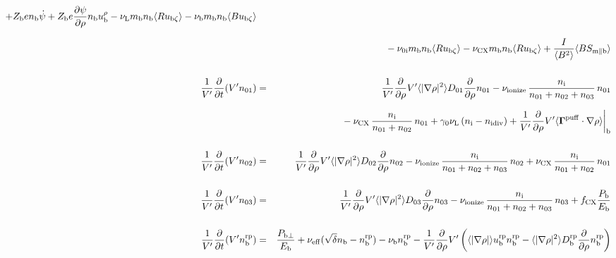 \documentclass[11pt]{article}
\def\bvec#1{\leavevmode\hbox{\boldmath$#1$}}
\let\vec=\bvec
\def\r#1{{\rm#1}}
\def\aves#1{\langle#1\rangle}
\def\dd#1#2{\frac{\partial #1}{\partial #2}}
\def\para{\parallel}
\def\ddrho{\frac{\partial}{\partial\rho}}
\def\ddV{\frac{\partial}{\partial V}}
\def\mi{m_\r{i}}
\def\mb{m_\r{b}}
\def\nee{n_\r{e}}
\def\ni{n_\r{i}}
\def\nb{n_\r{b}}
\def\nna{n_{01}}
\def\nnb{n_{02}}
\def\nnc{n_{03}}
\def\Te{T_\r{e}}
\def\Zi{Z_\r{i}}
\def\Zb{Z_\r{b}}
\def\Pb{P_\r{b}}
\def\Eb{E_\r{b}}
\def\uezt{u_{\r{e}\zeta}}
\def\ubzt{u_{\r{b}\zeta}}
\def\uepara{u_{\r{e}\para}}
\def\ubrho{u_\r{b}^\rho}
\def\bri{\aves{B^2}\aves{R^2} - I^2}
\def\ddt{\frac{\partial}{\partial t}}
\def\De{D_\r{e}}
\def\nbrp{n_\r{b}^\r{rp}}
\def\Pbperp{P_{\r{b}\perp}}
\def\nueff{\nu_\r{eff}}
\def\ubrp{u_\r{b}^\r{rp}}
\def\Dbrp{D_\r{b}^\r{rp}}
\def\fCX{f_\r{CX}}
\def\nuni{\nu_\r{0i}}
\def\nuL{\nu_\r{L}}
\def\nuCX{\nu_\r{CX}}
\def\nuion{\nu_\r{ionize}}
\def\nub{\nu_\r{b}}
\def\nidiv{n_\r{idiv}}
\def\nuOL{\nu_\r{OL}}
\def\red#1{\textcolor{red}{#1}}
\begin{document}
\begin{eqnarray}
%
  + \Zb e              \nb \dot{\psi}
%
  + \Zb e \dd{\psi}{\rho} \nb \ubrho
%
%
  - \nuL  \mb \nb \aves{R \ubzt}
%
  - \nub  \mb \nb \aves{B \ubzt}
\nonumber\\[2.5mm]&&{}
%
  - \nuni \mb \nb \aves{R \ubzt}
%
  - \nuCX \mb \nb \aves{R \ubzt}
%
%
  + \frac{I}{\aves{B^2}} \aves{B S_{\r{m}\para\r{b}}}
%
\\[5mm]
  \frac{1}{V'} \ddt (V' \nna) &=& 
%
    \frac{1}{V'} \ddrho V' \aves{|\nabla\rho|^2} D_{01} \ddrho \nna
%
  - \nuion\, \frac{\ni}{\nna + \nnb + \nnc}\, \nna
%
\nonumber\\[2.5mm]&&{}
  - \nuCX\, \frac{\ni}{\nna + \nnb}\, \nna
%
  + \gamma_0 \nuL \, (\ni - \nidiv)
%
  + \frac{1}{V'} \ddrho V' \aves{\vec{\Gamma}^\r{puff}\cdot\nabla\rho}\biggr|_\r{b}
\\[5mm]
  \frac{1}{V'} \ddt (V' \nnb) &=& 
%
    \frac{1}{V'} \ddrho V' \aves{|\nabla\rho|^2} D_{02} \ddrho \nnb
%
  - \nuion\, \frac{\ni}{\nna + \nnb + \nnc}\, \nnb
%
  + \nuCX\, \frac{\ni}{\nna + \nnb}\, \nna
%
\\[5mm]
  \frac{1}{V'} \ddt (V' \nnc) &=& 
%
    \frac{1}{V'} \ddrho V' \aves{|\nabla\rho|^2} D_{03} \ddrho \nnc
%
  - \nuion\, \frac{\ni}{\nna + \nnb + \nnc}\, \nnc
%
  + \fCX \frac{\Pb}{\Eb}
\\[5mm]
  \frac{1}{V'} \ddt (V' \nbrp) &=&
%
    \frac{\Pbperp}{\Eb}
%
  + \nueff (\sqrt{\delta} \nb - \nbrp)
%
  - \nub \nbrp
%
  - \frac{1}{V'} \ddrho V' \left( \aves{|\nabla\rho|} \ubrp \nbrp - \aves{|\nabla\rho|^2} \Dbrp \ddrho \nbrp \right)
%
\end{eqnarray}

\bigskip
\end{document}

